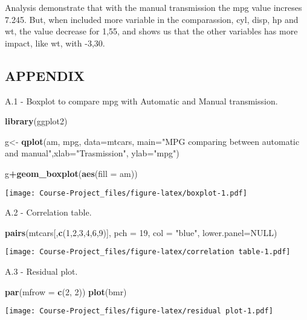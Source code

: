 \documentclass[]{article}
\newenvironment{Shaded}{\begin{snugshade}}{\end{snugshade}}
\newcommand{\DataTypeTok}[1]{\textcolor[rgb]{0.13,0.29,0.53}{#1}}
\newcommand{\DecValTok}[1]{\textcolor[rgb]{0.00,0.00,0.81}{#1}}
\newcommand{\KeywordTok}[1]{\textcolor[rgb]{0.13,0.29,0.53}{\textbf{#1}}}
\newcommand{\NormalTok}[1]{#1}
\newcommand{\OperatorTok}[1]{\textcolor[rgb]{0.81,0.36,0.00}{\textbf{#1}}}
\newcommand{\OtherTok}[1]{\textcolor[rgb]{0.56,0.35,0.01}{#1}}
\newcommand{\StringTok}[1]{\textcolor[rgb]{0.31,0.60,0.02}{#1}}
\begin{document}
Analysis demonstrate that with the manual transmission the mpg value
increses 7.245. But, when included more variable in the comparassion,
cyl, disp, hp and wt, the value decrease for 1,55, and shows us that the
other variables has more impact, like wt, with -3,30.

\hypertarget{appendix}{%
\subsection{APPENDIX}\label{appendix}}

A.1 - Boxplot to compare mpg with Automatic and Manual transmission.

\begin{Shaded}
\begin{Highlighting}[]
\KeywordTok{library}\NormalTok{(ggplot2)}

\NormalTok{g<-}\StringTok{ }\KeywordTok{qplot}\NormalTok{(am, mpg, }\DataTypeTok{data=}\NormalTok{mtcars, }\DataTypeTok{main=}\StringTok{"MPG comparing between automatic and manual"}\NormalTok{,}\DataTypeTok{xlab=}\StringTok{"Trasmission"}\NormalTok{, }\DataTypeTok{ylab=}\StringTok{"mpg"}\NormalTok{)}

\NormalTok{g}\OperatorTok{+}\KeywordTok{geom_boxplot}\NormalTok{(}\KeywordTok{aes}\NormalTok{(}\DataTypeTok{fill =}\NormalTok{ am))}
\end{Highlighting}
\end{Shaded}

\texttt{[image: Course-Project\_files/figure-latex/boxplot-1.pdf]}

A.2 - Correlation table.

\begin{Shaded}
\begin{Highlighting}[]
\KeywordTok{pairs}\NormalTok{(mtcars[,}\KeywordTok{c}\NormalTok{(}\DecValTok{1}\NormalTok{,}\DecValTok{2}\NormalTok{,}\DecValTok{3}\NormalTok{,}\DecValTok{4}\NormalTok{,}\DecValTok{6}\NormalTok{,}\DecValTok{9}\NormalTok{)], }\DataTypeTok{pch =} \DecValTok{19}\NormalTok{, }\DataTypeTok{col =} \StringTok{"blue"}\NormalTok{, }\DataTypeTok{lower.panel=}\OtherTok{NULL}\NormalTok{)}
\end{Highlighting}
\end{Shaded}

\texttt{[image: Course-Project\_files/figure-latex/correlation table-1.pdf]}

A.3 - Residual plot.

\begin{Shaded}
\begin{Highlighting}[]
\KeywordTok{par}\NormalTok{(}\DataTypeTok{mfrow =} \KeywordTok{c}\NormalTok{(}\DecValTok{2}\NormalTok{, }\DecValTok{2}\NormalTok{))}
\KeywordTok{plot}\NormalTok{(bmr)}
\end{Highlighting}
\end{Shaded}

\texttt{[image: Course-Project\_files/figure-latex/residual plot-1.pdf]}
\end{document}
